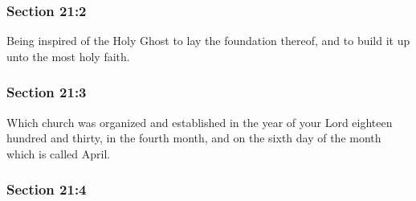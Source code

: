 
	\subsubsection{Section 21:2} %
		\label{DC21-2}

		Being inspired of the Holy Ghost to lay the foundation thereof, and to build it up unto the most holy faith.


	\subsubsection{Section 21:3} %
		\label{DC21-3}

		Which church was organized and established in the year of your Lord eighteen hundred and thirty, in the fourth month, and on the sixth day of the month which is called April.


	\subsubsection{Section 21:4} %
		\label{DC21-4}

